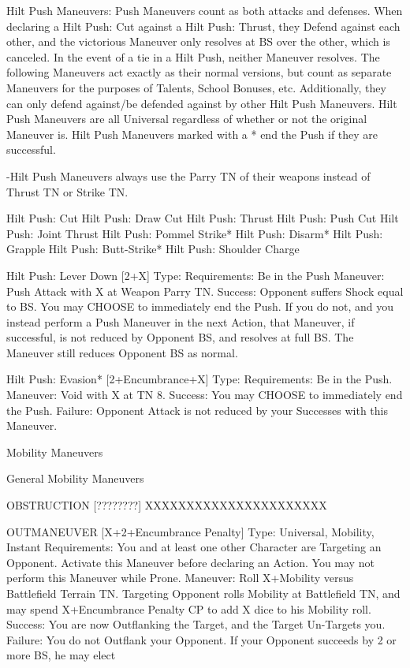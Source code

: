 \documentclass[oneside,11pt,english]{book}
\begin{document}
 

Hilt Push Maneuvers: Push Maneuvers count as both attacks and defenses. When declaring a Hilt Push: 
Cut against a Hilt Push: Thrust, they Defend against each other, and the victorious Maneuver only 
resolves at BS over the other, which is canceled. 
In the event of a tie in a Hilt Push, neither Maneuver resolves. 
The following Maneuvers act exactly as their normal versions, but count as separate Maneuvers for the 
purposes of Talents, School Bonuses, etc. Additionally, they can only defend against/be defended against 
by other Hilt Push Maneuvers. Hilt Push Maneuvers are all Universal regardless of whether or not the 
original Maneuver is. 
Hilt Push Maneuvers marked with a * end the Push if they are successful. 


-Hilt Push Maneuvers always use the Parry TN of their weapons instead of Thrust TN or Strike TN. 

 

Hilt Push: Cut 
Hilt Push: Draw Cut 
Hilt Push: Thrust 
Hilt Push: Push Cut 
Hilt Push: Joint Thrust 
Hilt Push: Pommel Strike* 
Hilt Push: Disarm* 
Hilt Push: Grapple 
Hilt Push: Butt-Strike* 
Hilt Push: Shoulder Charge 

 

Hilt Push: Lever Down [2+X] 
Type: 
Requirements: Be in the Push 
Maneuver: Push Attack with X at Weapon Parry TN. 
Success: Opponent suffers Shock equal to BS. You may CHOOSE to immediately end the Push. If you 
do not, and you instead perform a Push Maneuver in the next Action, that Maneuver, if successful, is not 
reduced by Opponent BS, and resolves at full BS. The Maneuver still reduces Opponent BS as normal. 

 

Hilt Push: Evasion* [2+Encumbrance+X] 
Type: 
Requirements: Be in the Push. 
Maneuver: Void with X at TN 8. 
Success: You may CHOOSE to immediately end the Push. 
Failure: Opponent Attack is not reduced by your Successes with this Maneuver. 

 

 

Mobility Maneuvers 

 

General Mobility Maneuvers 

 

OBSTRUCTION [????????] 
XXXXXXXXXXXXXXXXXXXXXX 

 

OUTMANEUVER [X+2+Encumbrance Penalty] 
Type: Universal, Mobility, Instant 
Requirements: You and at least one other Character are Targeting an Opponent. Activate this Maneuver 
before declaring an Action. You may not perform this Maneuver while Prone. 
Maneuver: Roll X+Mobility versus Battlefield Terrain TN. Targeting Opponent rolls Mobility at 
Battlefield TN, and may spend X+Encumbrance Penalty CP to add X dice to his Mobility roll. 
Success: You are now Outflanking the Target, and the Target Un-Targets you. 
Failure: You do not Outflank your Opponent. If your Opponent succeeds by 2 or more BS, he may elect 
\end{document}
